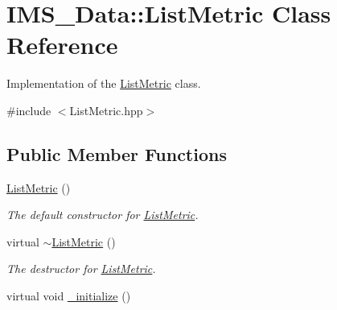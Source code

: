 \hypertarget{classIMS__Data_1_1ListMetric}{
\section{IMS\_\-Data::ListMetric Class Reference}
\label{classIMS__Data_1_1ListMetric}
}


Implementation of the \hyperlink{classIMS__Data_1_1ListMetric}{ListMetric} class.  




{\ttfamily \#include $<$ListMetric.hpp$>$}

\subsection*{Public Member Functions}
\begin{DoxyCompactItemize}
\item 
\hypertarget{classIMS__Data_1_1ListMetric_ab3ba2b72a3f55b0785cafa1c2ea4a08f}{
\hyperlink{classIMS__Data_1_1ListMetric_ab3ba2b72a3f55b0785cafa1c2ea4a08f}{ListMetric} ()}
\label{classIMS__Data_1_1ListMetric_ab3ba2b72a3f55b0785cafa1c2ea4a08f}

\begin{DoxyCompactList}\small\item\em The default constructor for \hyperlink{classIMS__Data_1_1ListMetric}{ListMetric}. \item\end{DoxyCompactList}\item 
\hypertarget{classIMS__Data_1_1ListMetric_ad6ee7a244d66b9dc18ad11c975799b08}{
virtual \hyperlink{classIMS__Data_1_1ListMetric_ad6ee7a244d66b9dc18ad11c975799b08}{$\sim$ListMetric} ()}
\label{classIMS__Data_1_1ListMetric_ad6ee7a244d66b9dc18ad11c975799b08}

\begin{DoxyCompactList}\small\item\em The destructor for \hyperlink{classIMS__Data_1_1ListMetric}{ListMetric}. \item\end{DoxyCompactList}\item 
\hypertarget{classIMS__Data_1_1ListMetric_a72c017dd5b9c6c481aa22b6d8a6bc4ab}{
virtual void \hyperlink{classIMS__Data_1_1ListMetric_a72c017dd5b9c6c481aa22b6d8a6bc4ab}{\_\-initialize} ()}
\label{classIMS__Data_1_1ListMetric_a72c017dd5b9c6c481aa22b6d8a6bc4ab}


\end{DoxyCompactItemize}
